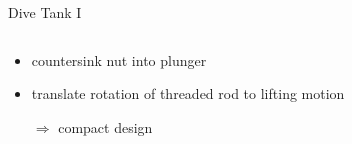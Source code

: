 \documentclass{beamer}
\begin{document}
	\begin{frame}[t]{Dive Tank I}
		\begin{columns}[T]
			\begin{column}{0.5\textwidth}
				\begin{minipage}{\textwidth}
					\resizebox{0.9\textwidth}{!}{}
				\end{minipage}
				\begin{minipage}{\textwidth}
					\vspace{0.5cm}
					\begin{itemize}
						\item countersink nut into plunger
						\item translate rotation of threaded rod to lifting motion
						\item[$\Rightarrow$] compact design\uncover<2>{,\textcolor{red}{ but unfortunatly leaky}}
					\end{itemize}
				\end{minipage}
			\end{column}
			\begin{column}{0.5\textwidth}
				\begin{center}

\end{center}
\end{column}
\end{columns}
\end{frame}
\end{document}
